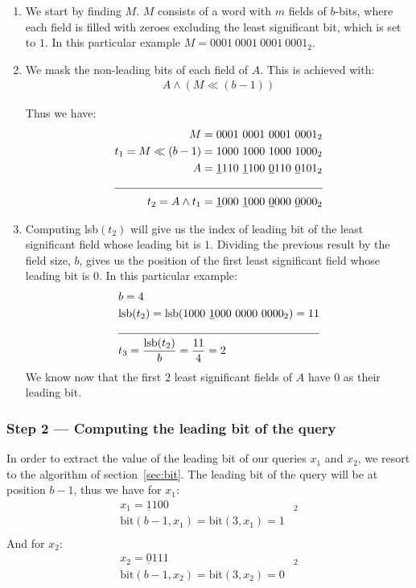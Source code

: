 \begin{enumerate}
    \item
    We start by finding $M$. $M$ consists of a word with $m$ fields of $b$-bits, where each field is filled with zeroes excluding the least significant bit, which is set to $1$. In this particular example $M = 0001\ 0001\ 0001\ 0001_2$.
    
    \item %
    We mask the non-leading bits of each field of $A$. This is achieved with:
    \begin{align*}
        A \wedge (M \ll (b - 1))
    \end{align*}
    
    Thus we have:
    \begin{align*}
        M &= 0001\ 0001\ 0001\ 0001_2 \\
        t_1 = M \ll (b - 1) &= 1000\ 1000\ 1000\ 1000_2 \\
        A &= \underline{1}110\ \underline{1}100\ \underline{0}110\ \underline{0}101_2 \\
        \cline{1-2}
        t_2 = A \wedge t_1 &= \underline{1}000\ \underline{1}000\ \underline{0}000\ \underline{0}000_2
    \end{align*}
    
    \item
    Computing lsb$(t_2)$ will give us the index of leading bit of the least significant field whose leading bit is $1$. Dividing the previous result by the field size, $b$, gives us the position of the first least significant field whose leading bit is $0$. In this particular example:
    \begin{align*}
        &b = 4 \\
        &\text{lsb}(t_2) = \text{lsb}(1000\ \underline{1}000\ 0000\ 0000_2) = 11 \\
        \cline{1-2}
        &t_3 = \frac{\text{lsb}(t_2)}{b} = \frac{11}{4} = 2 \\
    \end{align*}
    We know now that the first $2$ least significant fields of $A$ have $0$ as their leading bit.
\end{enumerate}

\subsubsection{Step 2 --- Computing the leading bit of the query}
In order to extract the value of the leading bit of our queries $x_1$ and $x_2$, we resort to the algorithm of section~\ref{sec:bit}. The leading bit of the query will be at position $b - 1$, thus we have for $x_1$:
\begin{align*}
    x_1 = \underline{1}100&_2\\
    \text{bit}(b - 1, x_1) = \text{bit}(3, x_1) = 1\\
\end{align*}
And for $x_2$:
\begin{align*}
    x_2 = \underline{0}111&_2\\
    \text{bit}(b - 1, x_2) = \text{bit}(3, x_2) = 0\\
\end{align*}

